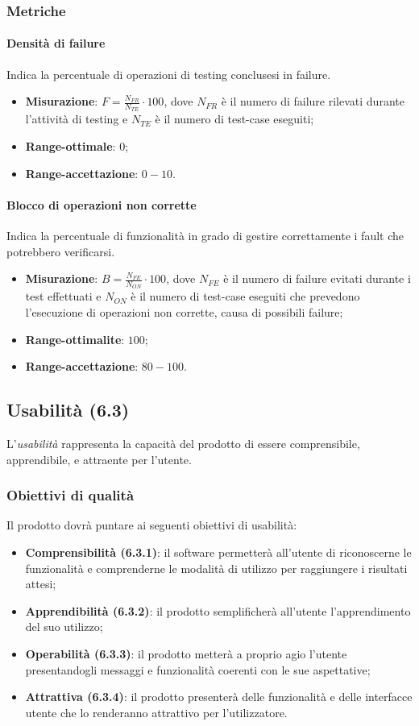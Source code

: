 \subsubsection{Metriche}
\paragraph{Densità di failure}
Indica la percentuale di operazioni di testing conclusesi in failure.
\begin{itemize}
\item \textbf{Misurazione}: $F=\frac{N_{FR}}{N_{TE}} \cdot 100$, dove $N_{FR}$ è il numero di failure rilevati durante l'attività di testing e $N_{TE}$ è il numero di test-case eseguiti;
\item \textbf{Range-ottimale}: $0$;
\item \textbf{Range-accettazione}: $0 - 10$.
\end{itemize}
\paragraph{Blocco di operazioni non corrette}
Indica la percentuale di funzionalità in grado di gestire correttamente i fault che potrebbero verificarsi.
\begin{itemize}
\item \textbf{Misurazione}: $B=\frac{N_{FE}}{N_{ON}} \cdot 100$, dove $N_{FE}$ è il numero di failure evitati durante i test effettuati e $N_{ON}$ è il numero di test-case eseguiti che prevedono l'esecuzione di operazioni non corrette, causa di possibili failure;
\item \textbf{Range-ottimalite}: $100$;
\item \textbf{Range-accettazione}: $80 - 100$.
\end{itemize}

\subsection{Usabilità (6.3)}
L'\textit{usabilità} rappresenta la capacità del prodotto di essere comprensibile, apprendibile, e attraente per l'utente.
\subsubsection{Obiettivi di qualità}
Il prodotto dovrà puntare ai seguenti obiettivi di usabilità:
\begin{itemize}
\item \textbf{Comprensibilità (6.3.1)}: il software permetterà all'utente di riconoscerne le funzionalità e comprenderne le modalità di utilizzo per raggiungere i risultati attesi;
\item \textbf{Apprendibilità (6.3.2)}: il prodotto semplificherà all'utente l'apprendimento del suo utilizzo;
\item \textbf{Operabilità (6.3.3)}: il prodotto metterà a proprio agio l'utente presentandogli messaggi e funzionalità coerenti con le sue aspettative;
\item \textbf{Attrattiva (6.3.4)}: il prodotto presenterà delle funzionalità e delle interfacce utente che lo renderanno attrattivo per l'utilizzatore.
\end{itemize}
